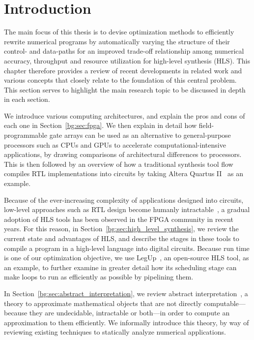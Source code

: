 \section{Introduction}
\label{bg:sec:introduction}

The main focus of this thesis is to devise optimization methods to efficiently
rewrite numerical programs by automatically varying the structure of their
control- and data-paths for an improved trade-off relationship among numerical
accuracy, throughput and resource utilization for high-level synthesis (HLS).
This chapter therefore provides a review of recent developments in related work
and various concepts that closely relate to the foundation of this central
problem.  This section serves to highlight the main research topic to be
discussed in depth in each section.

We introduce various computing architectures, and explain the pros and cons
of each one in Section~\ref{bg:sec:fpga}.  We then explain in detail how
field-programmable gate arrays can be used as an alternative to general-purpose
processors such as CPUs and GPUs to accelerate computational-intensive
applications, by drawing comparisons of architectural differences to
processors.  This is then followed by an overview of how a traditional
synthesis tool flow compiles RTL implementations into circuits by taking Altera
Quartus II~\cite{quartus} as an example.

Because of the ever-increasing complexity of applications designed
into circuits, low-level approaches such as RTL design become humanly
intractable~\cite{gajski}, a gradual adoption of HLS tools has been
observed in the FPGA community in recent years.  For this reason, in
Section~\ref{bg:sec:high_level_synthesis}, we review the current state and
advantages of HLS, and describe the stages in these tools to compile a program
in a high-level language into digital circuits.  Because run time is one of our
optimization objective, we use LegUp~\cite{legup}, an open-source HLS tool, as
an example, to further examine in greater detail how its scheduling stage can
make loops to run as efficiently as possible by pipelining them.

In Section~\ref{bg:sec:abstract_interpretation}, we review abstract
interpretation~\cite{cousot77}, a theory to approximate mathematical objects
that are not directly computable---because they are undecidable, intractable or
both---in order to compute an approximation to them efficiently.  We informally
introduce this theory, by way of reviewing existing techniques to statically
analyze numerical applications.

